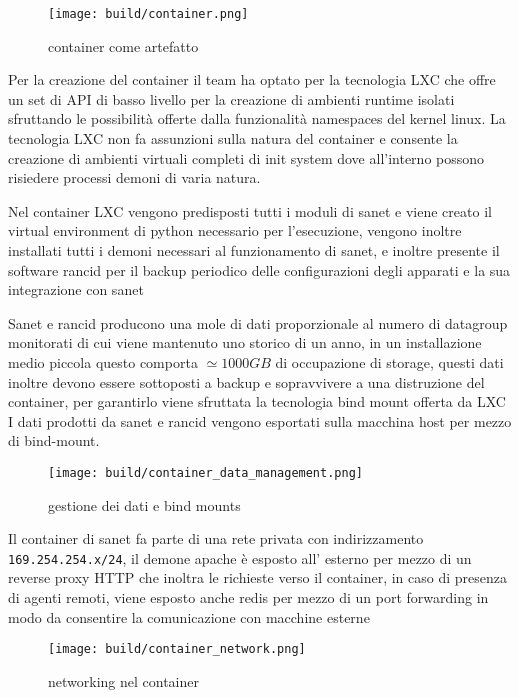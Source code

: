 \begin{figure}[H]
    \centering
    \texttt{[image: build/container.png]}
    \caption{container come artefatto}
    \label{fig:enter-label}
\end{figure}

Per la creazione del container il team ha optato per la tecnologia LXC\cite{LXC} che offre un set di API di basso livello per la creazione di ambienti runtime isolati sfruttando le possibilità offerte dalla funzionalità namespaces del kernel linux. La tecnologia LXC non fa assunzioni sulla natura del container e consente la creazione di ambienti virtuali completi di init system dove all'interno possono risiedere processi demoni di varia natura.

Nel container LXC vengono predisposti tutti i moduli di sanet e viene creato il virtual environment di python necessario per l'esecuzione, vengono inoltre installati tutti i demoni necessari al funzionamento di sanet, e inoltre presente il software rancid per il backup periodico delle configurazioni degli apparati e la sua integrazione con sanet

Sanet e rancid producono una mole di dati proporzionale al numero di datagroup monitorati di cui viene mantenuto uno storico di un anno, in un installazione medio piccola questo comporta \(\simeq 1000 GB\) di occupazione di storage, questi dati inoltre devono essere sottoposti a backup e sopravvivere a una distruzione del container, per garantirlo viene sfruttata la tecnologia bind mount offerta da LXC\cite{LXC}
I dati prodotti da sanet e rancid vengono esportati sulla macchina host per mezzo di bind-mount.

\begin{figure}[H]
    \centering
    \texttt{[image: build/container\_data\_management.png]}
    \caption{gestione dei dati e bind mounts}
    \label{fig:enter-label}
\end{figure}

Il container di sanet fa parte di una rete privata con indirizzamento \verb|169.254.254.x/24|, il demone apache è esposto all' esterno per mezzo di un reverse proxy HTTP che inoltra le richieste verso il container, in caso di presenza di agenti remoti, viene esposto anche redis per mezzo di un port forwarding in modo da consentire la comunicazione con macchine esterne

\begin{figure}[H]
    \centering
    \texttt{[image: build/container\_network.png]}
    \caption{networking nel container}
    \label{fig:enter-label}
\end{figure}

